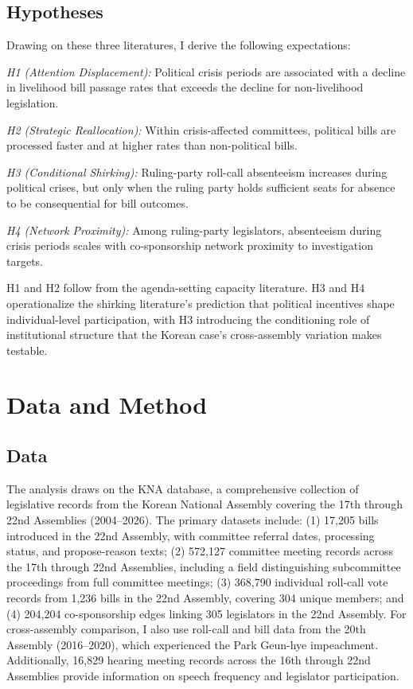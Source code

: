 \documentclass[11pt]{article}
\begin{document}
\subsection{Hypotheses}

Drawing on these three literatures, I derive the following expectations:

\medskip
\noindent \textit{H1 (Attention Displacement):} Political crisis periods are associated with a decline in livelihood bill passage rates that exceeds the decline for non-livelihood legislation.

\medskip
\noindent \textit{H2 (Strategic Reallocation):} Within crisis-affected committees, political bills are processed faster and at higher rates than non-political bills.

\medskip
\noindent \textit{H3 (Conditional Shirking):} Ruling-party roll-call absenteeism increases during political crises, but only when the ruling party holds sufficient seats for absence to be consequential for bill outcomes.

\medskip
\noindent \textit{H4 (Network Proximity):} Among ruling-party legislators, absenteeism during crisis periods scales with co-sponsorship network proximity to investigation targets.

\medskip

H1 and H2 follow from the agenda-setting capacity literature. H3 and H4 operationalize the shirking literature's prediction that political incentives shape individual-level participation, with H3 introducing the conditioning role of institutional structure that the Korean case's cross-assembly variation makes testable.

\section{Data and Method}

\subsection{Data}

The analysis draws on the KNA database, a comprehensive collection of legislative records from the Korean National Assembly covering the 17th through 22nd Assemblies (2004--2026). The primary datasets include: (1) 17,205 bills introduced in the 22nd Assembly, with committee referral dates, processing status, and propose-reason texts; (2) 572,127 committee meeting records across the 17th through 22nd Assemblies, including a field distinguishing subcommittee proceedings from full committee meetings; (3) 368,790 individual roll-call vote records from 1,236 bills in the 22nd Assembly, covering 304 unique members; and (4) 204,204 co-sponsorship edges linking 305 legislators in the 22nd Assembly. For cross-assembly comparison, I also use roll-call and bill data from the 20th Assembly (2016--2020), which experienced the Park Geun-hye impeachment. Additionally, 16,829 hearing meeting records across the 16th through 22nd Assemblies provide information on speech frequency and legislator participation.
\end{document}
